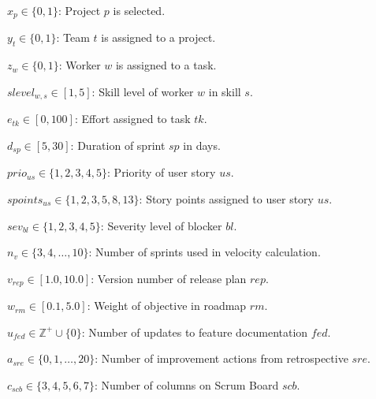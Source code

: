 \documentclass[12pt]{article}
\begin{document}
\item $ x_p \in \{0,1\} $: Project $ p $ is selected.
    \item $ y_t \in \{0,1\} $: Team $ t $ is assigned to a project.
    \item $ z_w \in \{0,1\} $: Worker $ w $ is assigned to a task.
    \item $ slevel_{w,s} \in [1,5] $: Skill level of worker $ w $ in skill $ s $.
    \item $ e_{tk} \in [0,100] $: Effort assigned to task $ tk $.
    \item $ d_{sp} \in [5,30] $: Duration of sprint $ sp $ in days.
    \item $ prio_{us} \in \{1,2,3,4,5\} $: Priority of user story $ us $.
    \item $ spoints_{us} \in \{1,2,3,5,8,13\} $: Story points assigned to user story $ us $.
    \item $ sev_{bl} \in \{1,2,3,4,5\} $: Severity level of blocker $ bl $.
    \item $ n_{v} \in \{3,4,\dots,10\} $: Number of sprints used in velocity calculation.
    \item $ v_{rep} \in [1.0, 10.0] $: Version number of release plan $ rep $.
    \item $ w_{rm} \in [0.1, 5.0] $: Weight of objective in roadmap $ rm $.
    \item $ u_{fed} \in \mathbb{Z}^+ \cup \{0\} $: Number of updates to feature documentation $ fed $.
    \item $ a_{sre} \in \{0,1,\dots,20\} $: Number of improvement actions from retrospective $ sre $.
    \item $ c_{scb} \in \{3,4,5,6,7\} $: Number of columns on Scrum Board $ scb $.
\end{document}
